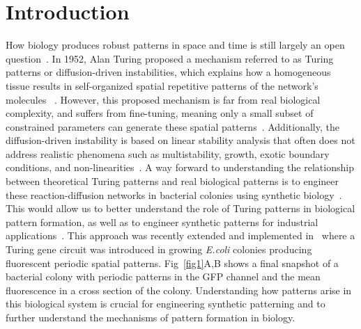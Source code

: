 \documentclass[10pt,letterpaper]{article}
\begin{document}
\linenumbers

\section*{Introduction}

How biology produces robust patterns in space and time is still largely an open question~\parencite{scholes2017three}.
In 1952, Alan Turing proposed a mechanism referred to as Turing patterns or diffusion-driven instabilities, which explains how a homogeneous tissue results in self-organized spatial repetitive patterns of the network’s molecules ~\parencite{Turing1952, Gierer1972}.
However, this proposed mechanism is far from real biological complexity, and suffers from fine-tuning, meaning only a small subset of constrained parameters can generate these spatial patterns~\parencite{maini2012turing, Scholes2019}.
Additionally, the diffusion-driven instability is based on linear stability analysis that often does not address realistic phenomena such as multistability, growth, exotic boundary conditions, and non-linearities~\parencite{Krause2023}.
A way forward to understanding the relationship between theoretical Turing patterns and real biological patterns is to engineer these reaction-diffusion networks in bacterial colonies using synthetic biology~\parencite{Sekine2018, Karig2018}.
This would allow us to better understand the role of Turing patterns in biological pattern formation, as well as to engineer synthetic patterns for industrial applications~\parencite{cao2017programmable, tan2018polyamide,din2020interfacing}.
This approach was recently extended and implemented in~\cite{Oliver2023} where a Turing gene circuit was introduced in growing \textit{E.coli} colonies producing fluorescent periodic spatial patterns. Fig~\ref{fig1}A,B shows a final snapshot of a bacterial colony with periodic patterns in the GFP channel and the mean fluorescence in a cross section of the colony.
Understanding how patterns arise in this biological system is crucial for engineering synthetic patterning and to further understand the mechanisms of pattern formation in biology.
\end{document}
